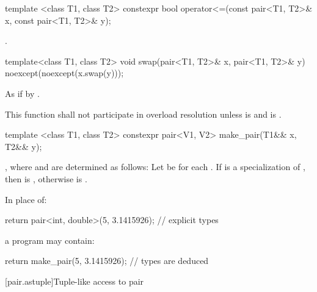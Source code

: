 %
\begin{itemdecl}
template <class T1, class T2>
  constexpr bool operator<=(const pair<T1, T2>& x, const pair<T1, T2>& y);
\end{itemdecl}

\begin{itemdescr}
\pnum
\returns {}.
\end{itemdescr}


%
\begin{itemdecl}
template<class T1, class T2> void swap(pair<T1, T2>& x, pair<T1, T2>& y)
  noexcept(noexcept(x.swap(y)));
\end{itemdecl}

\begin{itemdescr}
\pnum
\effects As if by .

\pnum
\remarks
This function shall not participate in overload resolution unless
 is  and
 is .
\end{itemdescr}

%
\begin{itemdecl}
template <class T1, class T2>
  constexpr pair<V1, V2> make_pair(T1&& x, T2&& y);
\end{itemdecl}

\begin{itemdescr}
\pnum
\returns {},
where  and  are determined as follows: Let  be
 for each . If  is a specialization
of , then  is ,
otherwise  is .
\end{itemdescr}

\pnum
\begin{example}
In place of:
\begin{codeblock}
  return pair<int, double>(5, 3.1415926);   // explicit types
\end{codeblock}
a \Cpp program may contain:
\begin{codeblock}
  return make_pair(5, 3.1415926);           // types are deduced
\end{codeblock}
\end{example}

[pair.astuple]{Tuple-like access to pair}

